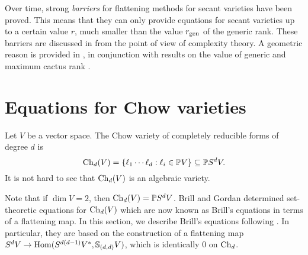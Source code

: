 Over time, strong \emph{barriers} for flattening methods for secant varieties have been proved. This means that they can only provide equations for secant varieties up to a certain value $r$, much smaller than the value $r_{\mathrm{gen}}$ of the generic rank. These barriers are discussed in \cite{EGOW18} from the point of view of complexity theory. A geometric reason is provided in \cite{Gal17}, in conjunction with results on the value of generic and maximum cactus rank \cite{BR13,BBG19}. 




\section{Equations for Chow varieties}
\label{RepTheory-section-chowvarieties}

Let $V$ be a vector space. The Chow variety of completely reducible forms of degree $d$ is
\[
\mathrm{Ch}_d(V) = \{ \ell_1 \cdots \ell_d : \ell_i \in \mathbb{P} V\} \subseteq \mathbb{P} S^d V.
\]
It is not hard to see that $\mathrm{Ch}_d(V)$ is an algebraic variety. 

Note that if $\dim V = 2$, then $\mathrm{Ch}_d(V) = \mathbb{P} S^d V$. Brill \cite{Bri98} and Gordan \cite{Gor94} determined set-theoretic equations for $\mathrm{Ch}_d(V)$ which are now known as Brill's equations in terms of a flattening map. In this section, we describe Brill's equations following \cite{Lan12,Gua18}. In particular, they are based on the construction of a flattening map $S^d V \to \operatorname{Hom}(S^{d(d-1)} V^*, \mathbb{S}_{(d,d)} V )$, which is identically $0$ on $\mathrm{Ch}_d$. 

